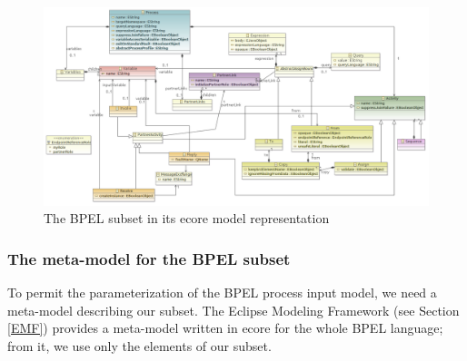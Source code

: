 \begin{figure}
  \begin{center}
    \includegraphics[scale=0.67,angle=90]{pictures/SubSetBpel2.png}
    \caption{The BPEL subset in its ecore model representation}
    \label{fig:SubSetBPEL}
  \end{center}
\end{figure} 

\subsubsection{The meta-model for the BPEL subset}
\label{Sec:DesignBpelSubset}
To permit the parameterization of the BPEL process input model, we need a meta-model describing our subset. The Eclipse Modeling Framework (see Section \ref{EMF}) provides a meta-model written in ecore for the whole BPEL language; from it, we use only the elements of our subset.
